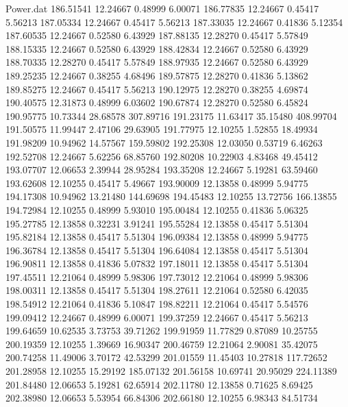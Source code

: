 \begin{filecontents}{Power.dat}
 186.51541   12.24667    0.48999    6.00071
 186.77835   12.24667    0.45417    5.56213
 187.05334   12.24667    0.45417    5.56213
 187.33035   12.24667    0.41836    5.12354
 187.60535   12.24667    0.52580    6.43929
 187.88135   12.28270    0.45417    5.57849
 188.15335   12.24667    0.52580    6.43929
 188.42834   12.24667    0.52580    6.43929
 188.70335   12.28270    0.45417    5.57849
 188.97935   12.24667    0.52580    6.43929
 189.25235   12.24667    0.38255    4.68496
 189.57875   12.28270    0.41836    5.13862
 189.85275   12.24667    0.45417    5.56213
 190.12975   12.28270    0.38255    4.69874
 190.40575   12.31873    0.48999    6.03602
 190.67874   12.28270    0.52580    6.45824
 190.95775   10.73344   28.68578  307.89716
 191.23175   11.63417   35.15480  408.99704
 191.50575   11.99447    2.47106   29.63905
 191.77975   12.10255    1.52855   18.49934
 191.98209   10.94962   14.57567  159.59802
 192.25308   12.03050    0.53719    6.46263
 192.52708   12.24667    5.62256   68.85760
 192.80208   10.22903    4.83468   49.45412
 193.07707   12.06653    2.39944   28.95284
 193.35208   12.24667    5.19281   63.59460
 193.62608   12.10255    0.45417    5.49667
 193.90009   12.13858    0.48999    5.94775
 194.17308   10.94962   13.21480  144.69698
 194.45483   12.10255   13.72756  166.13855
 194.72984   12.10255    0.48999    5.93010
 195.00484   12.10255    0.41836    5.06325
 195.27785   12.13858    0.32231    3.91241
 195.55284   12.13858    0.45417    5.51304
 195.82184   12.13858    0.45417    5.51304
 196.09384   12.13858    0.48999    5.94775
 196.36784   12.13858    0.45417    5.51304
 196.64084   12.13858    0.45417    5.51304
 196.90811   12.13858    0.41836    5.07832
 197.18011   12.13858    0.45417    5.51304
 197.45511   12.21064    0.48999    5.98306
 197.73012   12.21064    0.48999    5.98306
 198.00311   12.13858    0.45417    5.51304
 198.27611   12.21064    0.52580    6.42035
 198.54912   12.21064    0.41836    5.10847
 198.82211   12.21064    0.45417    5.54576
 199.09412   12.24667    0.48999    6.00071
 199.37259   12.24667    0.45417    5.56213
 199.64659   10.62535    3.73753   39.71262
 199.91959   11.77829    0.87089   10.25755
 200.19359   12.10255    1.39669   16.90347
 200.46759   12.21064    2.90081   35.42075
 200.74258   11.49006    3.70172   42.53299
 201.01559   11.45403   10.27818  117.72652
 201.28958   12.10255   15.29192  185.07132
 201.56158   10.69741   20.95029  224.11389
 201.84480   12.06653    5.19281   62.65914
 202.11780   12.13858    0.71625    8.69425
 202.38980   12.06653    5.53954   66.84306
 202.66180   12.10255    6.98343   84.51734

\end{filecontents}
